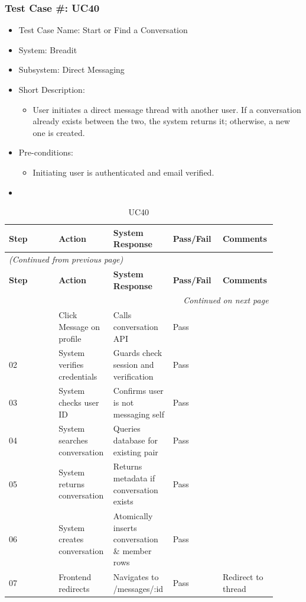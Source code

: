 \subsubsection{Test Case \#: UC40}
\begin{itemize}
  \item Test Case Name: Start or Find a Conversation
  \item System: Breadit
  \item Subsystem: Direct Messaging
  \item Short Description:
\begin{itemize}
  \item User initiates a direct message thread with another user. If a conversation already exists between the two, the system returns it; otherwise, a new one is created.
\end{itemize}
  \item Pre-conditions:
\begin{itemize}
  \item Initiating user is authenticated and email verified.
\end{itemize}
  \item 
\end{itemize}

\begin{longtable}{|p{0.18\linewidth}|p{0.18\linewidth}|p{0.18\linewidth}|p{0.18\linewidth}|p{0.18\linewidth}|}
\caption{UC40} \label{tab:39} \\
\hline
\textbf{Step} & \textbf{Action} & \textbf{System Response} & \textbf{Pass/Fail} & \textbf{Comments} \\
\hline
\endfirsthead
\multicolumn{5}{l}{\textit{(Continued from previous page)}} \\
\hline
\textbf{Step} & \textbf{Action} & \textbf{System Response} & \textbf{Pass/Fail} & \textbf{Comments} \\
\hline
\endhead
\hline \multicolumn{5}{r}{\textit{Continued on next page}} \\
\endfoot
\hline
\endlastfoot
01 & Click Message on profile & Calls conversation API & Pass &  \\
\hline
02 & System verifies credentials & Guards check session and verification & Pass &  \\
\hline
03 & System checks user ID & Confirms user is not messaging self & Pass &  \\
\hline
04 & System searches conversation & Queries database for existing pair & Pass &  \\
\hline
05 & System returns conversation & Returns metadata if conversation exists & Pass &  \\
\hline
06 & System creates conversation & Atomically inserts conversation \& member rows & Pass &  \\
\hline
07 & Frontend redirects & Navigates to /messages/:id & Pass & Redirect to thread \\
\hline
\end{longtable}

